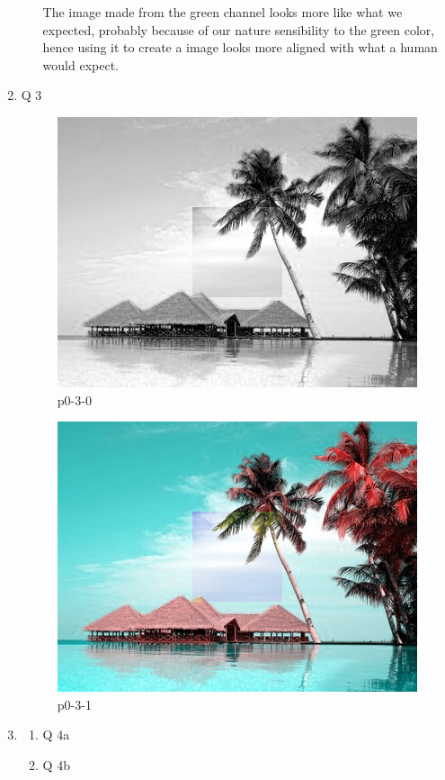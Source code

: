 \documentclass[12pt,a4paper]{article}
\begin{document}
\begin{enumerate}
\begin{enumerate}
The image made from the green channel looks more like what we expected, probably because of our nature sensibility to the green color, hence using it to create a image looks more aligned with what a human would expect.
\end{enumerate}

\item Q 3

\begin{figure}[ht]
\centering
\includegraphics{output/p0-3-0}
\caption{p0-3-0}
\label{fig:p0-3-0}
\end{figure}

\begin{figure}[ht]
\centering
\includegraphics{output/p0-3-1}
\caption{p0-3-1}
\label{fig:p0-3-1}
\end{figure}

\item
\begin{enumerate}
\item Q 4a

\item Q 4b


\end{enumerate}
\end{enumerate}
\end{document}
